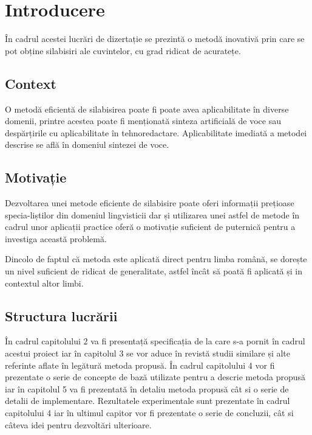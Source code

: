 \chapter{Introducere}
\label{cap:Introducere}


În cadrul acestei lucrări de dizertație se prezintă o metodă inovativă prin care se pot obține silabisiri ale cuvintelor, cu grad ridicat de acuratețe. 

\section{Context}

O metodă eficientă de silabisirea poate fi poate avea aplicabilitate în diverse domenii, printre acestea poate fi menționată sinteza artificială de voce sau despărțirile cu aplicabilitate în tehnoredactare. Aplicabilitate imediată a metodei descrise se află în domeniul sintezei de voce.

\section{Motivație}

Dezvoltarea unei metode eficiente de silabisire poate oferi informații prețioase specia-liștilor din domeniul lingvisticii dar și utilizarea unei astfel de metode în cadrul unor aplicații practice oferă o motivație suficient de puternică pentru a investiga această problemă. 

Dincolo de faptul că metoda este aplicată direct pentru limba română, se dorește un nivel suficient de ridicat de generalitate, astfel încât să poată fi aplicată și in contextul altor limbi.

\section{Structura lucrării}

În cadrul capitolului 2 va fi presentață specificația de la care s-a pornit în cadrul acestui proiect iar în capitolul 3 se vor aduce în revistă studii similare și alte referinte aflate în legătură metoda propusă. În cadrul capitolului 4 vor fi prezentate o serie de concepte de bază utilizate pentru a descrie metoda propusă iar în capitolul 5 va fi prezentată în detaliu metoda propusă cât si o serie de detalii de implementare. Rezultatele experimentale sunt prezentate în cadrul capitolului 4 iar în ultimul capitor vor fi prezentate o serie de concluzii, cât si câteva idei pentru dezvoltări ulterioare. 